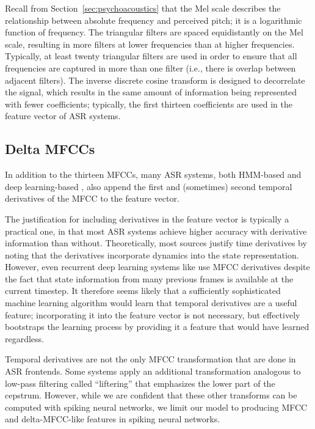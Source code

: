 Recall from Section~\ref{sec:psychoacoustics}
that the Mel scale
describes the relationship between
absolute frequency and perceived pitch;
it is a logarithmic function of frequency.
The triangular filters are spaced
equidistantly on the Mel scale,
resulting in more filters
at lower frequencies than at higher frequencies.
Typically, at least twenty triangular filters
are used in order to ensure that all frequencies
are captured in more than one filter
(i.e., there is overlap between adjacent filters).
The inverse discrete cosine transform
is designed to decorrelate the signal,
which results in the same amount
of information being represented
with fewer coefficients;
typically, the first thirteen coefficients
are used in the feature vector
of ASR systems.

\subsection{Delta MFCCs}

In addition to the thirteen MFCCs,
many ASR systems,
both HMM-based \citep{hain1999,gales2008}
and deep learning-based
\citep{graves2006,graves2008,fernandez2008},
also append the first
and (sometimes) second
temporal derivatives of the MFCC
to the feature vector.

The justification for including derivatives
in the feature vector is typically
a practical one,
in that most ASR systems
achieve higher accuracy with
derivative information than without.
Theoretically,
most sources justify time derivatives
by noting that the derivatives
incorporate dynamics into the state representation.
However,
even recurrent deep learning systems
like \citet{graves2008}
use MFCC derivatives
despite the fact that
state information from many previous frames
is available at the current timestep.
It therefore seems likely that
a sufficiently sophisticated machine learning algorithm
would learn that temporal derivatives
are a useful feature;
incorporating it into the feature vector
is not necessary,
but effectively bootstraps the learning process
by providing it a feature
that would have learned regardless.

Temporal derivatives are not the only
MFCC transformation that are done in ASR frontends.
Some systems apply an additional transformation
analogous to low-pass filtering
called ``liftering'' that emphasizes
the lower part of the cepstrum.
However, while we are confident
that these other transforms
can be computed with spiking neural networks,
we limit our model to producing
MFCC and delta-MFCC-like features
in spiking neural networks.


